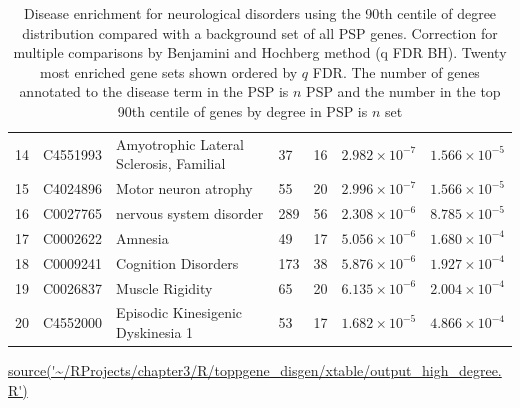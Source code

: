 \begin{table}[ht]
\begin{adjustbox}{width=\textwidth}
\begin{tabular}{lllllll}
  14 & C4551993 & Amyotrophic Lateral Sclerosis, Familial & 37 & 16 & $2.982 \times 10^{-7}$ & $1.566 \times 10^{-5}$ \\ 
  15 & C4024896 & Motor neuron atrophy & 55 & 20 & $2.996 \times 10^{-7}$ & $1.566 \times 10^{-5}$ \\ 
  16 & C0027765 & nervous system disorder & 289 & 56 & $2.308 \times 10^{-6}$ & $8.785 \times 10^{-5}$ \\ 
  17 & C0002622 & Amnesia & 49 & 17 & $5.056 \times 10^{-6}$ & $1.680 \times 10^{-4}$ \\ 
  18 & C0009241 & Cognition Disorders & 173 & 38 & $5.876 \times 10^{-6}$ & $1.927 \times 10^{-4}$ \\ 
  19 & C0026837 & Muscle Rigidity & 65 & 20 & $6.135 \times 10^{-6}$ & $2.004 \times 10^{-4}$ \\ 
  20 & C4552000 & Episodic Kinesigenic Dyskinesia 1 & 53 & 17 & $1.682 \times 10^{-5}$ & $4.866 \times 10^{-4}$ \\ 
   \bottomrule
\end{tabular}
\end{adjustbox}
\caption{Disease enrichment for neurological disorders using the 90th centile of degree distribution compared with a background set of all PSP genes. Correction for multiple comparisons by Benjamini and Hochberg method (q FDR BH). Twenty most enriched gene sets shown ordered by $q$ FDR. The number of genes annotated to the disease term in the PSP is $n$ PSP and the number in the top 90th centile of genes by degree in PSP is $n$ set } 
\tiny\url{source('~/RProjects/chapter3/R/toppgene_disgen/xtable/output_high_degree.R')}

\end{table}
